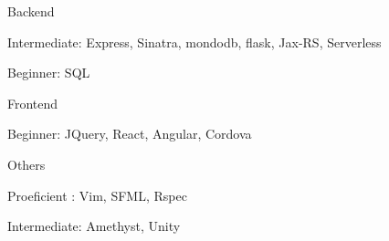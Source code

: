 \begin{cvskills}
  \cvskill
    {Backend} %
    {
      \begin{cvitems} %
        \item Intermediate:                 Express, Sinatra, mondodb, flask, Jax-RS, Serverless
        \item Beginner:\hspace{5mm}         SQL
      \end{cvitems}
    }
  \cvskill
    {Frontend} %
    {
      \begin{cvitems} %
      \item Beginner:\hspace{5mm}                     JQuery, React, Angular, Cordova
      \end{cvitems}
    }
  \cvskill
    {Others} %
    {
      \begin{cvitems} %
      \item Proeficient :\hspace{2.5mm}   Vim, SFML, Rspec
      \item Intermediate:                 Amethyst, Unity
      \end{cvitems}
    }


\end{cvskills}
